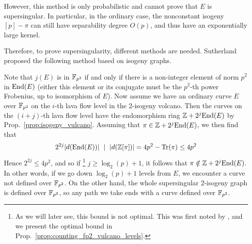 However, this method is only probabilistic and cannot prove that $E$ is supersingular.
In particular, in the ordinary case, the nonconstant isogeny $[p] - \pi$ can still have separability degree $O(p)$, and thus have an exponentially large kernel.

Therefore, to prove supersingularity, different methods are needed.
Sutherland \cite{sutherland_supersingularity_test} proposed the following method based on isogeny graphs.

Note that $j(E)$ is in $\mathbb{F}_{p^2}$ if and only if there is a non-integer element of norm $p^2$ in $\mathrm{End}(E)$ (either this element or its conjugate must be the $p^2$-th power Frobenius, up to isomorphism of $E$).
Now assume we have an ordinary curve $E$ over $\mathbb{F}_{p^2}$ on the $i$-th lava flow level in the $2$-isogeny volcano.
Then the curves on the $(i + j)$-th lava flow level have the endomorphism ring $\mathbb{Z} + 2^j\mathrm{End}(E)$ by Prop.~\ref{prop:isogeny_vulcano}.
Assuming that $\pi \in \mathbb{Z} + 2^j\mathrm{End}(E)$, we then find that
\begin{equation*}
    2^{2j} |d(\mathrm{End}(E))| \ \mid \  |d(\mathbb{Z}[\pi])| = 4p^2 - \mathrm{Tr}(\pi) \leq 4p^2
\end{equation*}
Hence $2^{2j} \leq 4p^2$, and so if
\footnote{As we will later see, this bound is not optimal. This was first noted by \cite{fp_supersingularity_tests}, and we present the optimal bound in Prop.~\ref{prop:counting_fp2_vulcano_levels}.}
$j \geq \log_2(p) + 1$, it follows that $\pi \notin \mathbb{Z} + 2^j\mathrm{End}(E)$.
In other words, if we go down $\log_2(p) + 1$ levels from $E$, we encounter a curve not defined over $\mathbb{F}_{p^2}$.
On the other hand, the whole supersingular 2-isogeny graph is defined over $\mathbb{F}_{p^2}$, so any path we take ends with a curve defined over $\mathbb{F}_{p^2}$.

